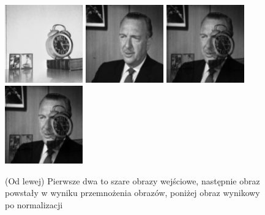 \documentclass[final,a4paper,openany,12pt]{mwbk}
\begin{document}
\begin{figure}[H]
	\begin{center}
		\includegraphics[width=0.3\textwidth]{1/1Gray_Img1_Multipl_Original}
		\includegraphics[width=0.3\textwidth]{1/1Gray_Img2_Multipl_Original}
		\includegraphics[width=0.3\textwidth]{1/1Gray_Img_Multipl_Result}
		\includegraphics[width=0.3\textwidth]{1/1Gray_Img_Multipl_Result_Norm}
	\end{center}
	\caption{(Od lewej) Pierwsze dwa to szare obrazy wejściowe, następnie obraz powstały w wyniku przemnożenia obrazów, poniżej obraz wynikowy po normalizacji }
\end{figure}
\end{document}
